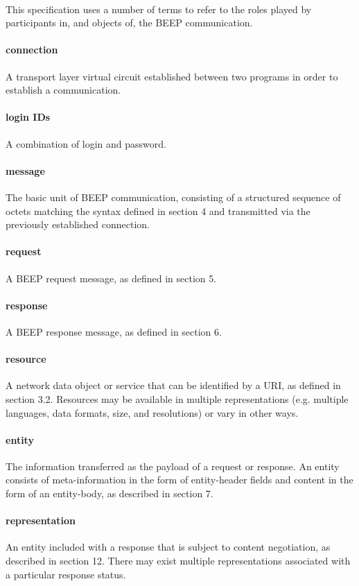         \paragraph{}
This specification uses a number of terms to refer to the roles
played by participants in, and objects of, the BEEP communication.
        \paragraph{connection}
A transport layer virtual circuit established between two programs
in order to establish a communication.
        \paragraph{login IDs}
A combination of login and password.
        \paragraph{message}
The basic unit of BEEP communication, consisting of a structured
sequence of octets matching the syntax defined in section 4 and
transmitted via the previously established connection.
        \paragraph{request}
A BEEP request message, as defined in section 5.
        \paragraph{response}
A BEEP response message, as defined in section 6.
        \paragraph{resource}
A network data object or service that can be identified by a URI,
as defined in section 3.2. Resources may be available in multiple
representations (e.g. multiple languages, data formats, size, and
resolutions) or vary in other ways.
        \paragraph{entity}
The information transferred as the payload of a request or
response. An entity consists of meta-information in the form of
entity-header fields and content in the form of an entity-body, as
described in section 7.
        \paragraph{representation}
An entity included with a response that is subject to content
negotiation, as described in section 12. There may exist multiple
representations associated with a particular response status.
